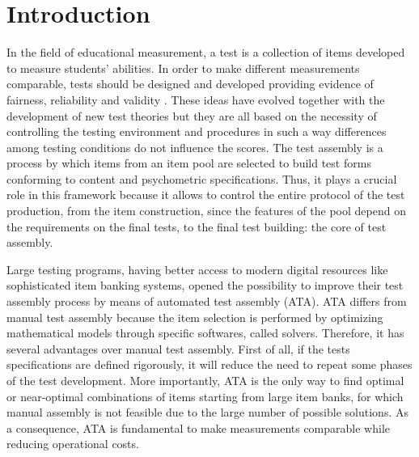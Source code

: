 
\chapter{Introduction} %

\label{Introduction2} %


\newcommand{\keyword}[1]{\textbf{#1}}
\newcommand{\tabhead}[1]{\textbf{#1}}
\newcommand{\code}[1]{\texttt{#1}}
\newcommand{\file}[1]{\texttt{\bfseries#1}}
\newcommand{\option}[1]{\texttt{\itshape#1}}

In the field of educational measurement, a test is a collection of items developed to measure students' abilities. In order to make different measurements comparable, tests should be designed and developed providing evidence of fairness, reliability and validity \parencite{AERA2014}. These ideas have evolved together with the development of new test theories but they are all based on the necessity of controlling the testing environment and procedures in such a way differences among testing conditions do not influence the scores. The test assembly is a process by which items from an item pool are selected to build test forms conforming to content and psychometric specifications. Thus, it plays a crucial role in this framework because it allows to control the entire protocol of the test production, from the item construction, since the features of the pool depend on the requirements on the final tests, to the final test building: the core of test assembly. 

Large testing programs, having better access to modern digital resources like sophisticated item banking systems, opened the possibility to improve their test assembly process by means of automated test assembly (ATA). ATA differs from manual test assembly because the item selection is performed by optimizing mathematical models through specific softwares, called solvers. Therefore, it has several advantages over manual test assembly. First of all, if the tests specifications are defined rigorously, it will reduce the need to repeat some phases of the test development. More importantly, ATA is the only way to find optimal or near-optimal combinations of items starting from large item banks, for which manual assembly is not feasible due to the large number of possible solutions. As a consequence, ATA is fundamental to make measurements comparable while reducing operational costs. 

